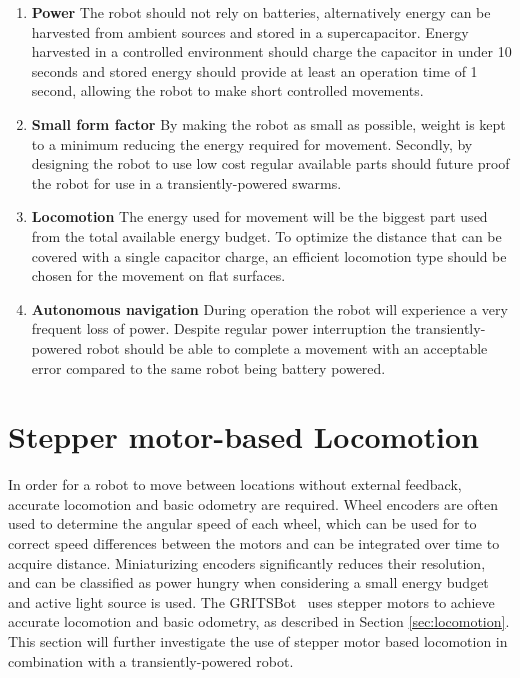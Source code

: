 
\begin{enumerate}
\item \textbf{Power} The robot should not rely on batteries, alternatively energy can be harvested from ambient sources and stored in a supercapacitor. 
Energy harvested in a controlled environment should charge the capacitor in under 10 seconds and stored energy should provide at least an operation time of 1 second, allowing the robot to make short controlled movements.

\item \textbf{Small form factor} By making the robot as small as possible, weight is kept to a minimum reducing the energy required for movement.
Secondly, by designing the robot to use low cost regular available parts should future proof the robot for use in a transiently-powered swarms.

\item \textbf{Locomotion}
The energy used for movement will be the biggest part used from the total available energy budget.
To optimize the distance that can be covered with a single capacitor charge, an efficient locomotion type should be chosen for the movement on flat surfaces.

\item \textbf{Autonomous navigation}
During operation the robot will experience a very frequent loss of power. 
Despite regular power interruption the transiently-powered robot should be able to complete a movement with an acceptable error compared to the same robot being battery powered. 

\end{enumerate}




\section{Stepper motor-based Locomotion}

In order for a robot to move between locations without external feedback, accurate locomotion and basic odometry are required.
Wheel encoders are often used to determine the angular speed of each wheel, which can be used for to correct speed differences between the motors and can be integrated over time to acquire distance.
Miniaturizing encoders significantly reduces their resolution, and can be classified as power hungry when considering a small energy budget and active light source is used.
The GRITSBot~\cite{pickem_icra_2015} uses stepper motors to achieve accurate locomotion and basic odometry, as described in Section \ref{sec:locomotion}.
This section will further investigate the use of stepper motor based locomotion in combination with a transiently-powered robot.

